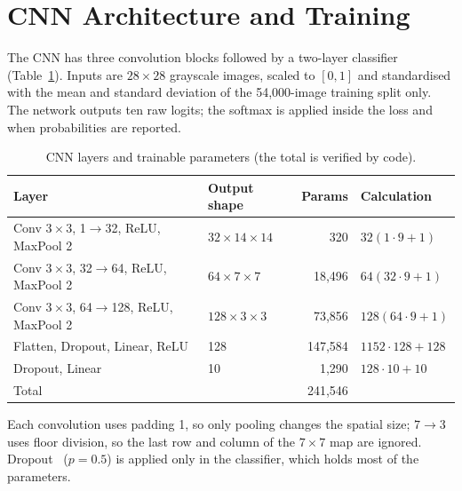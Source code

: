 \section{CNN Architecture and Training}
\label{sec:cnn}
The CNN has three convolution blocks followed by a two-layer classifier (Table~\ref{tab:cnn}).
Inputs are $28\times28$ grayscale images, scaled to $[0,1]$ and standardised with the mean and standard
deviation of the 54{,}000-image training split only. The network outputs ten raw logits; the softmax is
applied inside the loss and when probabilities are reported.

\begin{table}[t]
\centering
\caption{CNN layers and trainable parameters (the total is verified by code).}
\label{tab:cnn}
\footnotesize
\begin{tabular}{llrl}
\toprule
Layer & Output shape & Params & Calculation \\
\midrule
Conv $3{\times}3$, 1$\to$32, ReLU, MaxPool 2 & $32{\times}14{\times}14$ & 320 & $32(1\cdot 9+1)$ \\
Conv $3{\times}3$, 32$\to$64, ReLU, MaxPool 2 & $64{\times}7{\times}7$ & 18{,}496 & $64(32\cdot 9+1)$ \\
Conv $3{\times}3$, 64$\to$128, ReLU, MaxPool 2 & $128{\times}3{\times}3$ & 73{,}856 & $128(64\cdot 9+1)$ \\
Flatten, Dropout, Linear, ReLU & 128 & 147{,}584 & $1152\cdot128+128$ \\
Dropout, Linear & 10 & 1{,}290 & $128\cdot10+10$ \\
\midrule
Total & & 241{,}546 & \\
\bottomrule
\end{tabular}
\end{table}

Each convolution uses padding 1, so only pooling changes the spatial size; $7\to3$ uses floor division, so the last
row and column of the $7\times7$ map are ignored. Dropout~\cite{srivastava2014dropout} ($p=0.5$) is applied only in the classifier, which holds
most of the parameters.

